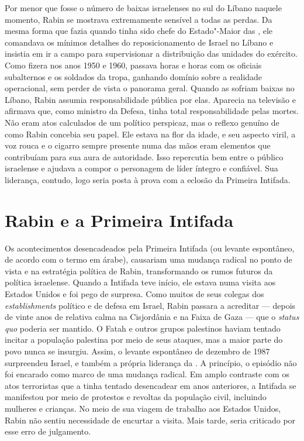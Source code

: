 Por menor que fosse o número de baixas israelenses no sul do Líbano
naquele momento, Rabin se mostrava extremamente sensível a todas as
perdas. Da mesma forma que fazia quando tinha sido chefe do Estado"-Maior
das , ele comandava os mínimos detalhes do reposicionamento de Israel
no Líbano e insistia em ir a campo para supervisionar a distribuição das
unidades do exército. Como fizera nos anos 1950 e 1960, passava horas e
horas com os oficiais subalternos e os soldados da tropa, ganhando
domínio sobre a realidade operacional, sem perder de vista o panorama
geral. Quando as  sofriam baixas no Líbano, Rabin assumia
responsabilidade pública por elas. Aparecia na televisão e afirmava que,
como ministro da Defesa, tinha total responsabilidade pelas mortes. Não
eram atos calculados de um político perspicaz, mas o reflexo genuíno de
como Rabin concebia seu papel. Ele estava na flor da idade, e seu
aspecto viril, a voz rouca e o cigarro sempre presente numa das mãos
eram elementos que contribuíam para sua aura de autoridade. Isso
repercutia bem entre o público israelense e ajudava a compor o
personagem de líder íntegro e confiável. Sua liderança, contudo, logo
seria posta à prova com a eclosão da Primeira Intifada.

\section{Rabin e a Primeira Intifada}

Os acontecimentos desencadeados pela Primeira Intifada (ou levante
espontâneo, de acordo com o termo em árabe), causariam uma mudança
radical no ponto de vista e na estratégia política de Rabin,
transformando os rumos futuros da política israelense. Quando a Intifada
teve início, ele estava numa visita aos Estados Unidos e foi pego de
surpresa. Como muitos de seus colegas dos \emph{establishments} político
e de defesa em Israel, Rabin passara a acreditar --- depois de vinte anos
de relativa calma na Cisjordânia e na Faixa de Gaza --- que o \emph{status quo}
poderia ser mantido. O Fatah e outros grupos palestinos haviam tentado
incitar a população palestina por meio de seus ataques, mas a maior
parte do povo nunca se insurgiu. Assim, o levante espontâneo de dezembro
de 1987 surpreendeu Israel, e também a própria liderança da . A
princípio, o episódio não foi encarado como marco de uma mudança radical. Em
amplo contraste com os atos terroristas que a  tinha tentado
desencadear em anos anteriores, a Intifada se manifestou por meio de
protestos e revoltas da população civil, incluindo mulheres e
crianças. No meio de sua viagem de trabalho aos Estados Unidos, Rabin
não sentiu necessidade de encurtar a visita. Mais tarde, seria criticado
por esse erro de julgamento.

